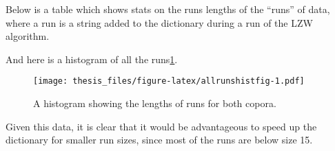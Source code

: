 \documentclass[12pt,twoside]{reedthesis}
\begin{document}
Below is a table which shows stats on the runs lengths of the ``runs'' of data, where a run is a string added to the dictionary during a run of the LZW algorithm.
\begin{table}[!h]

\caption{\label{tab:runstatsfig}Run Lengths for Corpus 1}
\centering
{}
\end{table}
\begin{table}[!h]

\caption{\label{tab:runstatsfig}Run Lengths for Corpus 2}
\centering
{}
\end{table}
And here is a histogram of all the runs\ref{fig:allrunshistfig}.
\begin{table}[!h]

\caption{\label{tab:bothrunsfig}Run lengths for both corpora}
\centering
{}
\end{table}
\begin{figure}
\centering
\texttt{[image: thesis\_files/figure-latex/allrunshistfig-1.pdf]}
\caption{\label{fig:allrunshistfig}A histogram showing the lengths of runs for both copora.}
\end{figure}
Given this data, it is clear that it would be advantageous to speed up the dictionary for smaller run sizes, since most of the runs are below size 15.
\end{document}
